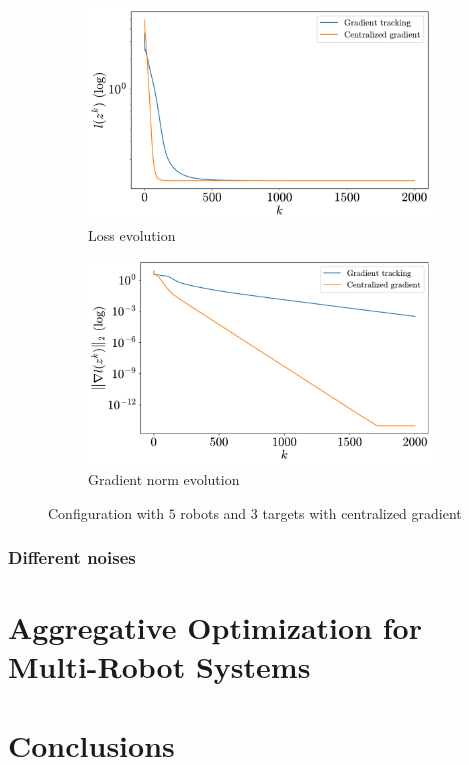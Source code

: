 \documentclass[a4paper,11pt,oneside]{book}
\begin{document}
\begin{figure}[H]
      \centering
      \begin{subfigure}[t]{0.49\textwidth}
            \centering
            \includegraphics[width=\linewidth]{./figs/tracking/loss_centralized_5_3_2_2000.pdf} 
            \caption{Loss evolution}
      \end{subfigure}
      \hfill
      \begin{subfigure}[t]{0.49\textwidth}
            \centering
            \includegraphics[width=\linewidth]{./figs/tracking/gradient_centralized_5_3_2_2000.pdf} 
            \caption{Gradient norm evolution}
      \end{subfigure}
      \caption{Configuration with $5$ robots and $3$ targets with centralized gradient}
\end{figure}


\subsection{Different noises}



\chapter{Aggregative Optimization for Multi-Robot Systems}





\chapter*{Conclusions}



{}

\end{document}
